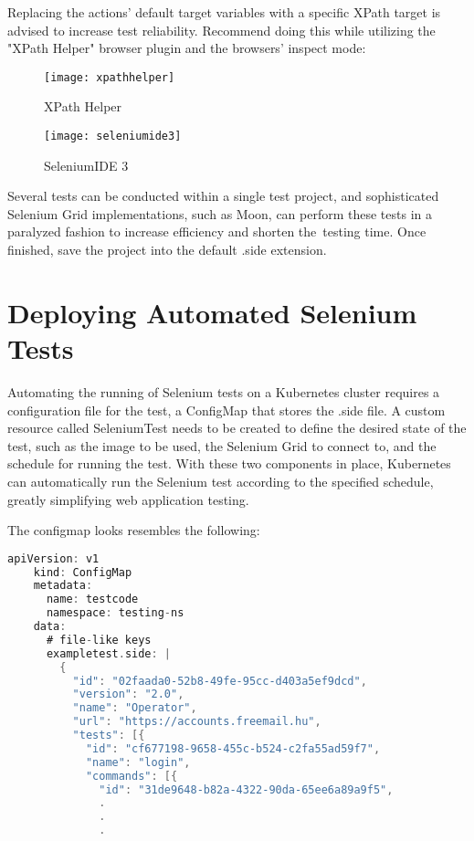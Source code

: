 Replacing the actions' default target variables with a specific XPath target is advised to increase test reliability. Recommend doing this while utilizing the "XPath Helper" browser plugin and the browsers' inspect mode:

\begin{figure}[H]
	\centering
	\texttt{[image: xpathhelper]}
	\label{fig:xpathhelper}
	\caption{XPath Helper}
\end{figure}

\begin{figure}[H]
	\centering
	\texttt{[image: seleniumide3]}
	\label{fig:seleniumide3}
	\caption{SeleniumIDE 3}
\end{figure}

Several tests can be conducted within a single test project, and sophisticated Selenium Grid implementations, such as Moon, can perform these tests in a paralyzed fashion to increase efficiency and shorten the testing time. Once finished, save the project into the default .side extension.

\section{Deploying Automated Selenium Tests}

Automating the running of Selenium tests on a Kubernetes cluster requires a configuration file for the test, a ConfigMap that stores the .side file. A custom resource called SeleniumTest needs to be created to define the desired state of the test, such as the image to be used, the Selenium Grid to connect to, and the schedule for running the test. With these two components in place, Kubernetes can automatically run the Selenium test according to the specified schedule, greatly simplifying web application testing.

The configmap looks resembles the following:
\begin{lstlisting}[language={Go}]
	apiVersion: v1
	kind: ConfigMap
	metadata:
	  name: testcode
	  namespace: testing-ns
	data:
	  # file-like keys
	  exampletest.side: |
		{
		  "id": "02faada0-52b8-49fe-95cc-d403a5ef9dcd",
		  "version": "2.0",
		  "name": "Operator",
		  "url": "https://accounts.freemail.hu",
		  "tests": [{
			"id": "cf677198-9658-455c-b524-c2fa55ad59f7",
			"name": "login",
			"commands": [{
			  "id": "31de9648-b82a-4322-90da-65ee6a89a9f5",
			  .
			  .
			  .
\end{lstlisting}

